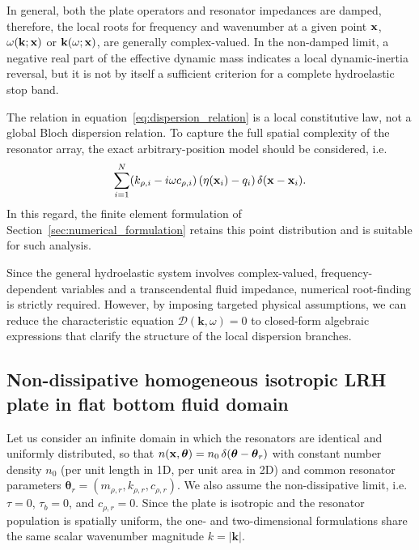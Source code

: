 In general, both the plate operators and resonator impedances are damped, therefore, the local roots for frequency and wavenumber at a given point $\mathbf{x}$, $\omega(\mathbf{k};\mathbf{x})$ or $\mathbf{k}(\omega;\mathbf{x})$, are generally complex-valued. In the non-damped limit, a negative real part of the effective dynamic mass indicates a local dynamic-inertia reversal, but it is not by itself a sufficient criterion for a complete hydroelastic stop band.

\begin{remark}
The relation in equation~\eqref{eq:dispersion_relation} is a local constitutive law, not a global Bloch dispersion relation. To capture the full spatial complexity of the resonator array, the exact arbitrary-position model should be considered, i.e. 
\begin{equation}\label{eq:arbitrary_resonator_distribution}
    \sum_{i=1}^N (k_{\rho,i}-i\omega c_{\rho,i})\left(\eta(\mathbf{x}_i)-q_i\right)
    \delta(\mathbf{x}-\mathbf{x}_i).
\end{equation}
In this regard, the finite element formulation of Section~\ref{sec:numerical_formulation} retains this point distribution and is suitable for such analysis.
\end{remark}

Since the general hydroelastic system involves complex-valued, frequency-dependent variables and a transcendental fluid impedance, numerical root-finding is strictly required. However, by imposing targeted physical assumptions, we can reduce the characteristic equation $\mathcal{D}(\mathbf{k}, \omega) = 0$ to closed-form algebraic expressions that clarify the structure of the local dispersion branches.

\subsection{Non-dissipative homogeneous isotropic LRH plate in flat bottom fluid domain}\label{subsubsec:non-dissipative_homogeneous_isotropic_dispersion}
Let us consider an infinite domain in which the resonators are identical and uniformly distributed, so that $n(\mathbf{x},\boldsymbol{\theta}) = n_0\,\delta(\boldsymbol{\theta}-\boldsymbol{\theta}_r)$ with constant number density $n_0$ (per unit length in 1D, per unit area in 2D) and common resonator parameters $\boldsymbol{\theta}_r=(m_{\rho,r},k_{\rho,r},c_{\rho,r})$. We also assume the non-dissipative limit, i.e. $\tau=0$, $\tau_b=0$, and $c_{\rho,r}=0$. Since the plate is isotropic and the resonator population is spatially uniform, the one- and two-dimensional formulations share the same scalar wavenumber magnitude $k=|\mathbf{k}|$.


